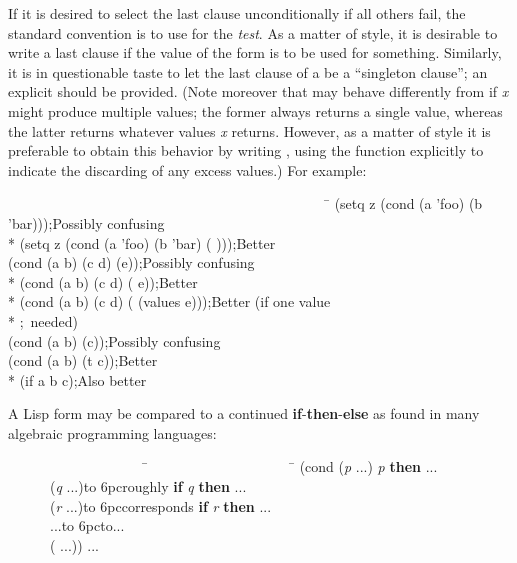 \begin{defmac}
If it is desired to select the last clause unconditionally if all others
fail, the standard convention is to use {\true} for the {\it test}.
As a matter of style, it is desirable to write a last clause
\cd{({\true} {\false})} if the value of the  form is to be used
for something.  Similarly, it is in questionable
taste to let the last clause of
a  be a ``singleton clause''; an explicit {\true} should be provided.
(Note moreover that  may behave differently from
 if {\it x} might produce multiple values;
the former always returns a single value, whereas the latter returns whatever
values {\it x} returns.  However, as a matter of style it is preferable
to obtain this behavior by writing ,
using the  function explicitly to indicate the discarding
of any excess values.)
For example:
\begin{lisp}
~~~~~~~~~~~~~~~~~~~~~~~~~~~~~~~~~~~~~~~~~~~~~~\=\kill
(setq z (cond (a 'foo) (b 'bar)))\>;{\rm Possibly confusing} \\*
(setq z (cond (a 'foo) (b 'bar) ({\true} {\false})))\>;{\rm Better} \\
(cond (a b) (c d) (e))\>;{\rm Possibly confusing} \\*
(cond (a b) (c d) ({\true} e))\>;{\rm Better} \\*
(cond (a b) (c d) ({\true} (values e)))\>;{\rm Better (if one value} \\*
                                       \>;~{\rm needed)} \\
(cond (a b) (c))\>;{\rm Possibly confusing} \\
(cond (a b) (t c))\>;{\rm Better} \\*
(if a b c)\>;{\rm Also better}
\end{lisp}
A Lisp  form may be compared to a continued {\bf if}-{\bf then}-{\bf else}
as found in many algebraic programming languages:
\begin{lisp}
~~~~~~~~~~~~~~~~~~~~\=~~~~~~~~~~~~~~~~~~~~~\=\kill
(cond ({\it p} ...)\> {\it p} {\bf then} ... \\
~~~~~~({\it q} ...)\>\hbox to 6pc{\hss\rm roughly\hss} {\bf if} {\it q} {\bf then} ... \\
~~~~~~({\it r} ...)\>\hbox to 6pc{\hss\rm corresponds\hss} {\bf if} {\it r} {\bf then} ... \\
~~~~~~...\>\hbox to 6pc{\hss\rm to\hss}\>... \\
~~~~~~({\true} ...))\> ...
\end{lisp}
\end{defmac}


